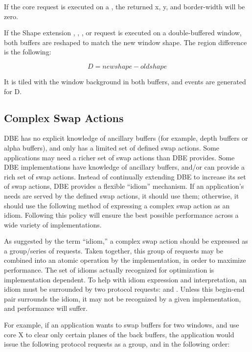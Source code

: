 If the core  request is executed on a
, the returned x, y, and border-width will be
zero.

If the Shape extension ,
, , or
 request is executed on a double-buffered
window, both buffers are reshaped to match the new window shape.  The
region difference is the following:

\[ D = new shape - old shape \]

It is tiled with the window background in both buffers,
and  events are generated for D.

\subsection{Complex Swap Actions}

DBE has no explicit knowledge of ancillary buffers (for example, depth buffers
or alpha buffers), and only has a limited set of defined swap actions.
Some applications may need a richer set of swap actions than DBE
provides.  Some DBE implementations have knowledge of ancillary
buffers, and/or can provide a rich set of swap actions.  Instead of
continually extending DBE to increase its set of swap actions, DBE
provides a flexible ``idiom'' mechanism.  If an application's needs
are served by the defined swap actions, it should use them; otherwise,
it should use the following method of expressing a complex swap action
as an idiom.  Following this policy will ensure the best possible
performance across a wide variety of implementations.

As suggested by the term ``idiom,'' a complex swap action should be
expressed as a group/series of requests.  Taken together, this group
of requests may be combined into an atomic operation by the
implementation, in order to maximize performance.  The set of idioms
actually recognized for optimization is implementation dependent.  To
help with idiom expression and interpretation, an idiom must be
surrounded by two protocol requests:  and
.  Unless this begin-end pair surrounds the
idiom, it may not be recognized by a given implementation, and
performance will suffer.

For example, if an application wants to swap buffers for two windows,
and use core X to clear only certain planes of the back buffers, the
application would issue the following protocol requests as a group, and
in the following order:

